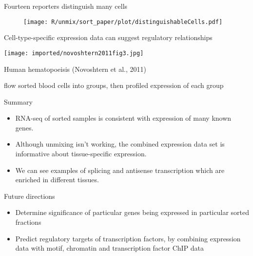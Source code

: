 \documentclass[serif,9pt]{beamer}
\begin{document}
\begin{frame}{Fourteen reporters distinguish many cells}

\begin{figure}
\begin{centering}
\texttt{[image: R/unmix/sort\_paper/plot/distinguishableCells.pdf]}

\end{centering}
\end{figure}

\end{frame}

\begin{frame}{Cell-type-specific expression data can suggest regulatory relationships}

\texttt{[image: imported/novoshtern2011fig3.jpg]}

Human hematopoeisis (Novoshtern et al., 2011)

{\small flow sorted blood cells into groups, then profiled expression of each group}

\end{frame}

\begin{frame}{Summary}

\begin{itemize}

\item RNA-seq of sorted samples is consistent with
expression of many known genes.

\item Although unmixing isn't working, the combined expression data
set is informative about tissue-specific expression.

\item We can see examples of splicing and antisense transcription
which are enriched in different tissues.

\end{itemize}

\end{frame}

\begin{frame}{Future directions}

\begin{itemize}

\item Determine significance of particular genes being expressed in particular
sorted fractions

\item Predict regulatory targets of transcription factors, by combining
expression data with motif, chromatin and transcription factor ChIP data

\end{itemize}

\end{frame}
\end{document}
